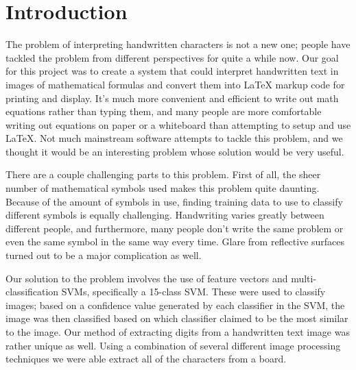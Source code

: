 \section{Introduction}

The problem of interpreting handwritten characters is not a new one; people have tackled the problem from different perspectives for quite a while now.  Our goal for this project was to create a system that could interpret handwritten text in images of mathematical formulas and convert them into LaTeX markup code for printing and display.  It's much more convenient and efficient to write out math equations rather than typing them, and many people are more comfortable writing out equations on paper or a whiteboard than attempting to setup and use LaTeX.  Not much mainstream software attempts to tackle this problem, and we thought it would be an interesting problem whose solution would be very useful.


There are a couple challenging parts to this problem.  First of all, the sheer number of mathematical symbols used makes this problem quite daunting.  Because of the amount of symbols in use, finding training data to use to classify different symbols is equally challenging. Handwriting varies greatly between different people, and furthermore, many people don't write the same problem or even the same symbol in the same way every time.  Glare from reflective surfaces turned out to be a major complication as well.

Our solution to the problem involves the use of feature vectors and multi-classification SVMs, specifically a 15-class SVM.  These were used to classify images; based on a confidence value generated by each classifier in the SVM, the image was then classified based on which classifier claimed to be the most similar to the image.  Our method of extracting digits from a handwritten text image was rather unique as well. Using a combination of several different image processing techniques we were able extract all of the characters from a board.
